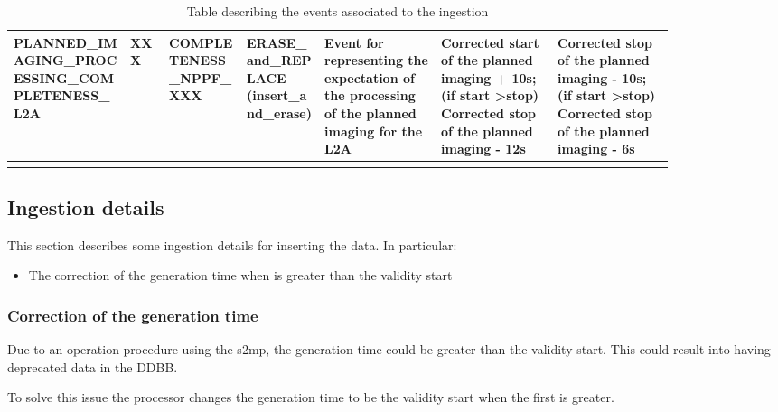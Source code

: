 \begin{landscape}
\begin{longtable}{|M{0.15\linewidth}|M{0.05\linewidth}|M{0.10\linewidth}|M{0.10\linewidth}|M{0.15\linewidth}|M{0.15\linewidth}|M{0.15\linewidth}|}
\textbf{PLANNED\_IMAGING\_PROCESSING\_COMPLETENESS\_L2A} & XXX & \- COMPLETENESS\_NPPF\_XXX & ERASE\_and\_REPLACE (insert\_and\_erase) & Event for representing the \textbf{expectation of the processing of the planned imaging for the L2A} & Corrected start of the planned imaging + 10s; (if start \textgreater  stop) Corrected stop of the planned imaging - 12s & Corrected stop of the planned imaging - 10s; (if start \textgreater  stop) Corrected stop of the planned imaging - 6s \\ \hline
\caption{Table describing the events associated to the ingestion}
\label{tb:description_events_ingestion_nppf}
\end{longtable}
\end{landscape}

\subsection{Ingestion details}

This section describes some ingestion details for inserting the data. In particular:

\begin{itemize} 

\item The correction of the generation time when is greater than the validity start
  
\end{itemize}

\subsubsection{Correction of the generation time}

Due to an operation procedure using the \acrshort{s2mp}, the generation time could be greater than the validity start. This could result into having deprecated data in the DDBB.

To solve this issue the processor changes the generation time to be the validity start when the first is greater.
